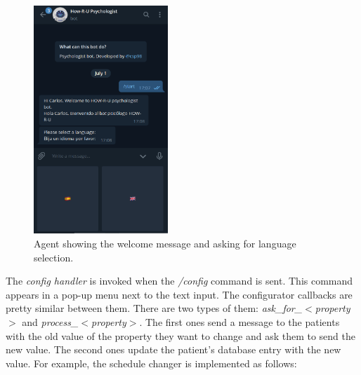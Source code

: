 \documentclass[12pt,english]{article}
\begin{document}
\begin{figure}[H]
  \centering
  \includegraphics[width=0.45\textwidth]{start.png}
  \caption{Agent showing the welcome message and asking for language selection.}
\end{figure}
\newpage
The \emph{config handler} is invoked when the \emph{/config} command is sent. This command appears in a pop-up menu next to the text input. The configurator callbacks are pretty similar between them. There are two types of them: \emph{ask\_for\_$<$property$>$} and \emph{process\_$<$property$>$}. The first ones send a message to the patients with the old value of the property they want to change and ask them to send the new value. The second ones update the patient's database entry with the new value. For example, the schedule changer is implemented as follows:
\end{document}
